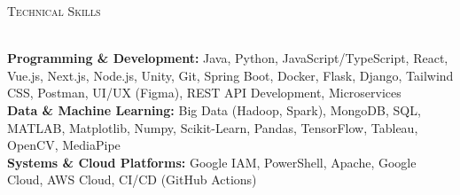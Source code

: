 \documentclass[a4paper]{article}
\newcommand{\lineunder} {
    \vspace*{-8pt} \\
    \hspace*{-18pt} \hrulefill \\
}
\newcommand{\header} [1] {
    {\hspace*{-18pt}\vspace*{6pt} \textsc{#1}}
    \vspace*{-6pt} \lineunder
}
\begin{document}
%
%
\header{Technical Skills}
\vspace{0mm}

\textbf{Programming \& Development:} 
{\small
Java, Python, JavaScript/TypeScript, React, Vue.js, Next.js, Node.js, Unity, Git, Spring Boot, Docker, Flask, Django, Tailwind CSS, Postman, UI/UX (Figma), REST API Development, Microservices\\
}
\textbf{Data \& Machine Learning:} 
{\small
Big Data (Hadoop, Spark), MongoDB, SQL, MATLAB, Matplotlib, Numpy, Scikit-Learn, Pandas, TensorFlow, Tableau, OpenCV, MediaPipe\\
}
\textbf{Systems \& Cloud Platforms:} 
{\small
Google IAM, PowerShell, Apache, Google Cloud, AWS Cloud, CI/CD (GitHub Actions)
}
\end{document}
